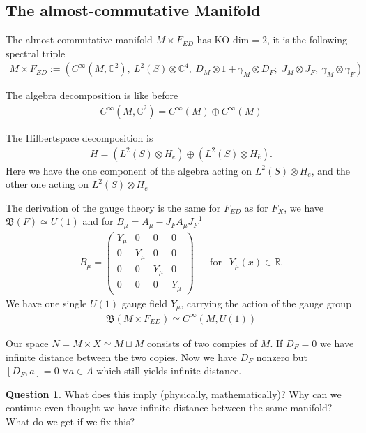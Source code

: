 \documentclass[a4paper]{article}
\theoremstyle{definition}
\theoremstyle{definition}
\newtheorem{question}{Question}
\theoremstyle{definition}
\theoremstyle{theorem}
\theoremstyle{theorem}
\theoremstyle{theorem}
\begin{document}
\subsection{The almost-commutative Manifold}
The almost commutative manifold $M\times F_{ED}$ has KO-dim$=2$, it is the
following spectral triple
\begin{align}
    M\times F_{ED} := \left(C^\infty(M,\mathbb{C}^2),\ L^2(S)\otimes
    \mathbb{C}^4,\
    D_M\otimes 1 +\gamma _M \otimes D_F;\; J_M\otimes J_F,\ \gamma_M\otimes
    \gamma _F\right)
\end{align}

The algebra decomposition is like before
\begin{align}
    C^\infty(M, \mathbb{C}^2) = C^\infty (M) \oplus C^\infty (M)
\end{align}

The Hilbertspace decomposition is
\begin{align}
    H = (L^2(S) \otimes H_e ) \oplus (L^2(S) \otimes H_{\bar{e}}).
\end{align}
Here we have the one component of the algebra acting on $L^2(S) \otimes H_e$,
and the other one acting on $L^2(S) \otimes H_{\bar{e}}$
\newline

The derivation of the gauge theory is the same for $F_{ED}$ as for $F_X$, we
have $\mathfrak{B}(F) \simeq U(1)$ and for $B_\mu = A_\mu - J_F A_\mu
J_F^{-1}$
\begin{align} \label{field}
    B_\mu =
    \begin{pmatrix}
        Y_\mu & 0 & 0 & 0 \\
        0 & Y_\mu& 0 & 0 \\
        0 & 0 & Y_\mu& 0 \\
        0 & 0 & 0 & Y_\mu
    \end{pmatrix} \;\;\;\;\;\ \text{for} \;\;\ Y_\mu (x) \in \mathbb{R}.
\end{align}
We have one single $U(1)$ gauge field $Y_\mu$, carrying the action of the
gauge group
\begin{align}
   \text{$\mathfrak{B}$}(M\times F_{ED}) \simeq C^\infty(M, U(1))
\end{align}

Our space $N = M\times X \simeq M\sqcup M$ consists of two compies of $M$.
If $D_F = 0$ we have infinite distance between the two copies. Now we have $D_F$
nonzero but $[D_F, a] = 0$ $\forall a \in A$ which still yields infinite
distance.
\begin{question}
    What does this imply (physically, mathematically)? Why can we continue
    even thought we have infinite distance between the same manifold? What do
    we get if we fix this?
\end{question}
\end{document}
